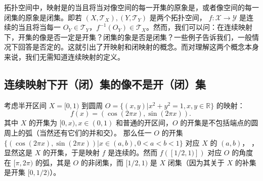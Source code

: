 
拓扑空间中，映射是的当且将当对像空间的每一开集的原象是，或者像空间的每一闭集的原象是闭集。即若 $(X,\mathcal T_X),(Y,\mathcal T_Y)$ 是两个拓扑空间， $f:\mathcal X\rightarrow\mathcal Y$ 是连续的当且将当每一 $O_Y\in\mathcal T_Y$，$f^{-1}(O_Y)\in\mathcal T_X$。然而，我们可以问：在连续映射下，开集的像是否一定是开集？闭集的象是否是闭集？一些例子告诉我们，一般情况下回答是否定的。这就引出了开映射和闭映射的概念。而对理解这两个概念本身来说，我们无需知道连续映射的定义。

\subsection{连续映射下开（闭）集的像不是开（闭）集}
\begin{example}{}
考虑半开区间 $X=[0,1)$ 到圆周 $O=\{(x,y)|x^2+y^2=1,x,y\in\mathbb R\}$ 的映射：
\begin{equation}
f(x)=(\cos(2\pi x),\sin(2\pi x)).~
\end{equation}
其中 $X$ 的开集为 $[0,x),x\in (0,1)$ 和普通的开区间，$O$ 的开集是不包括端点的圆周上的弧（当然还有它们的并和交）。
那么任一 $O$ 的开集 $\{(\cos(2\pi x),\sin(2\pi x))|x\in(a,b),0<a<b<1\}$ 对应 $X$ 的 $(a,b)$，
，显然这是 $X$ 的开集，于是映射 $f$ 是连续的。然而 $f([1/2,1)])$ 对应 $O$ 的角度在 $[\pi,2\pi)$ 的弧，其是 $O$ 的非闭集，而 $[1/2,1)$ 是 $X$ 闭集（因为其关于 $X$ 的补集是开集 $[0,1/2)$）。
\end{example}


